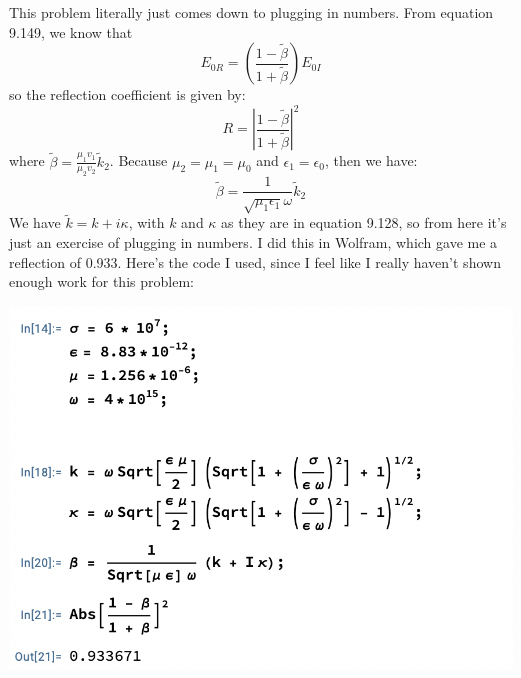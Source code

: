 \documentclass[10pt]{article}
\begin{document}
	\begin{solution}
		This problem literally just comes down to plugging in numbers. From equation 9.149, we know that
		\[
			E_{0R} = \left( \frac{1 - \tilde \beta}{1 + \tilde \beta} \right)E_{0I}
		\]
		so the reflection coefficient is given by:
		\[
			R = \left| \frac{1 - \tilde \beta}{1 + \tilde \beta} \right|^2
		\]
		where \( \tilde \beta = \frac{\mu_1v_1}{\mu_2v_2}\tilde k_2 \). Because \( \mu_2 = \mu_1 = \mu_0 \)
		and \( \epsilon_1 = \epsilon_0 \), then we have:
		\[
			\tilde \beta = \frac{1}{\sqrt{\mu_1 \epsilon_1} \omega} \tilde k_2
		\]
		We have \( \tilde k = k + i \kappa \), with \( k \) and \( \kappa \) as they are in equation 9.128,
		so from here it's just an exercise of plugging in numbers. I did this in Wolfram, which gave me a
		reflection of 0.933. Here's the code I used, since I feel like I really haven't shown enough work for
		this problem:
		\begin{center}
			\includegraphics[scale=0.8]{q3.png}
		\end{center}
	\end{solution}
\end{document}
